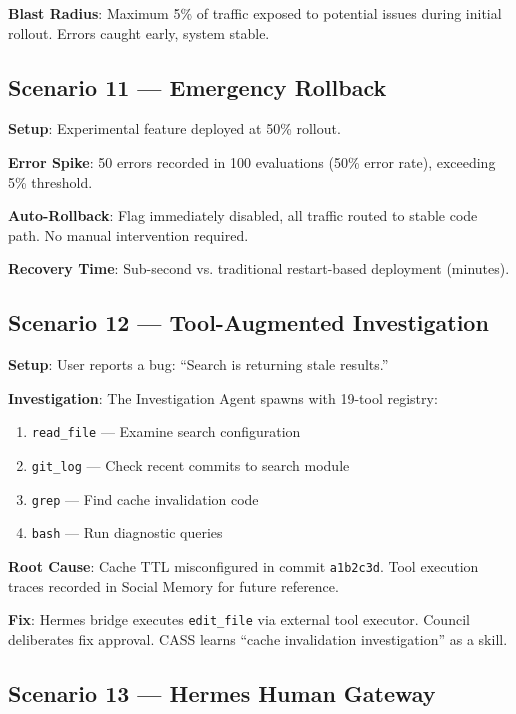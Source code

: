 \documentclass[11pt]{article}
\begin{document}
\noindent\textbf{Blast Radius}: Maximum 5\% of traffic exposed to potential
issues during initial rollout. Errors caught early, system stable.

\subsection{Scenario 11 --- Emergency Rollback}

\noindent\textbf{Setup}: Experimental feature deployed at 50\% rollout.

\noindent\textbf{Error Spike}: 50 errors recorded in 100 evaluations (50\% error
rate), exceeding 5\% threshold.

\noindent\textbf{Auto-Rollback}: Flag immediately disabled, all traffic routed to
stable code path. No manual intervention required.

\noindent\textbf{Recovery Time}: Sub-second vs. traditional restart-based
deployment (minutes).

\subsection{Scenario 12 --- Tool-Augmented Investigation}

\noindent\textbf{Setup}: User reports a bug: ``Search is returning stale results.''

\noindent\textbf{Investigation}: The Investigation Agent spawns with 19-tool
registry:
\begin{enumerate}[noitemsep,topsep=2pt]
  \item \texttt{read\_file} --- Examine search configuration
  \item \texttt{git\_log} --- Check recent commits to search module
  \item \texttt{grep} --- Find cache invalidation code
  \item \texttt{bash} --- Run diagnostic queries
\end{enumerate}

\noindent\textbf{Root Cause}: Cache TTL misconfigured in commit \texttt{a1b2c3d}.
Tool execution traces recorded in Social Memory for future reference.

\noindent\textbf{Fix}: Hermes bridge executes \texttt{edit\_file} via external
tool executor. Council deliberates fix approval. CASS learns ``cache
invalidation investigation'' as a skill.

\subsection{Scenario 13 --- Hermes Human Gateway}
\end{document}
